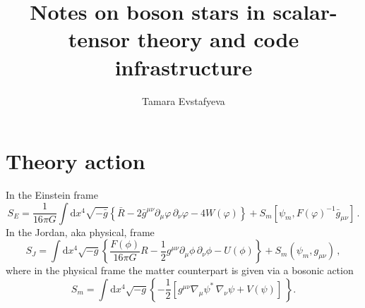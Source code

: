 \documentclass[12pt]{article}
\title{Notes on boson stars in scalar-tensor theory and code infrastructure}
\author{Tamara Evstafyeva}
\date{}
\newcommand{\du}{\mathrm{d}}
\numberwithin{equation}{section}
\newcounter{count}
\begin{document}
\maketitle
\newpage

\section{Theory action}
In the Einstein frame
\begin{equation}
  S_E = \frac{1}{16\pi G} \int \du x^4 \sqrt{-\bar{g}}
  \left\{
  \bar{R}-2\bar{g}^{\mu\nu} \partial_{\mu} \varphi\,
  \partial_{\nu}\varphi-4W(\varphi)
  \right\}
  + S_m [\psi_m,F(\varphi)^{-1} \bar{g}_{\mu\nu}]\,.
  \label{eq:SE}
\end{equation}
In the Jordan, aka physical, frame
\begin{equation}
  S_J = \int \du x^4 \sqrt{-g} \left\{
  \frac{F(\phi)}{16\pi G} R
  - \frac{1}{2} g^{\mu\nu}\partial_{\mu}\phi\,\partial_{\nu}\phi
  - U(\phi)
  \right\}
  +
  S_m(\psi_m,g_{\mu\nu})\,,
  \label{eq:SJ}
\end{equation}
where in the physical frame the matter counterpart is given via a bosonic action
\begin{equation}
  S_m = \int \du x^4 \sqrt{-g} \left\{
  -\frac{1}{2} \left[ g^{\mu\nu}\nabla_{\mu}\psi^*\,\nabla_{\nu} \psi
  + V(\psi)\right]\,
  \right\}.
\end{equation}

\end{document}
